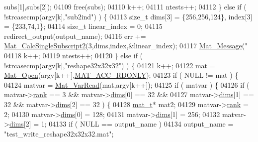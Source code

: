 \begin{DoxyCode}
{{{{{{{{{{{{{{{{{{{{{{{{{{{{{{{{{{{{{{{{{{{{{{{{{{{{{{{{{{{{{{{{{{{{{{      subs[1],subs[2]);
04109             free(subs);
04110             k++;
04111             ntests++;
04112         \} \textcolor{keywordflow}{else} \textcolor{keywordflow}{if} ( !strcasecmp(argv[k],\textcolor{stringliteral}{"sub2ind"}) ) \{
04113             \textcolor{keywordtype}{size\_t} dims[3] = \{256,256,124\}, index[3] = \{233,74,1\};
04114             \textcolor{keywordtype}{size\_t} linear\_index = 0;
04115             redirect\_output(output\_name);
04116             err += \hyperlink{group___m_a_t_ga5f7923e9d61ad728c127439044c4ae0e}{Mat\_CalcSingleSubscript2}(3,dims,index,&linear\_index);
04117             \hyperlink{group__mat__util_gae7dfa394b111bc908a616f8f5bddaa97}{Mat\_Message}(\textcolor{stringliteral}{"%
04118             k++;
04119             ntests++;
04120         \} \textcolor{keywordflow}{else} \textcolor{keywordflow}{if} ( !strcasecmp(argv[k],\textcolor{stringliteral}{"reshape32x32x32"}) ) \{
04121             k++;
04122             mat = \hyperlink{group___m_a_t_gafbfedb5636a99f0ef867520c47f77d18}{Mat\_Open}(argv[k++],\hyperlink{group___m_a_t_ggaa9dcbc70f538af79bd557593ff6b5cdba8dd1457651b27ba9bea6cfba158c037c}{MAT\_ACC\_RDONLY});
04123             \textcolor{keywordflow}{if} ( NULL != mat ) \{
04124                 matvar = \hyperlink{group___m_a_t_ga3505f63029763eaa73d5a19f1115eb42}{Mat\_VarRead}(mat,argv[k++]);
04125                 \textcolor{keywordflow}{if} ( matvar ) \{
04126                     \textcolor{keywordflow}{if} ( matvar->\hyperlink{group___m_a_t_a84ba70c96ded13cc555fa75b768d9921}{rank} == 3 && matvar->\hyperlink{group___m_a_t_a8e01234e1c862ce3472bb37f5a09b92c}{dims}[0] == 32 &&
04127                         matvar->\hyperlink{group___m_a_t_a8e01234e1c862ce3472bb37f5a09b92c}{dims}[1] == 32 && matvar->\hyperlink{group___m_a_t_a8e01234e1c862ce3472bb37f5a09b92c}{dims}[2] == 32 ) \{
04128                         \hyperlink{struct__mat__t}{mat\_t}* mat2;
04129                         matvar->\hyperlink{group___m_a_t_a84ba70c96ded13cc555fa75b768d9921}{rank} = 2;
04130                         matvar->\hyperlink{group___m_a_t_a8e01234e1c862ce3472bb37f5a09b92c}{dims}[0] = 128;
04131                         matvar->\hyperlink{group___m_a_t_a8e01234e1c862ce3472bb37f5a09b92c}{dims}[1] = 256;
04132                         matvar->\hyperlink{group___m_a_t_a8e01234e1c862ce3472bb37f5a09b92c}{dims}[2] = 1;
04133                         \textcolor{keywordflow}{if} ( NULL == output\_name )
04134                             output\_name = \textcolor{stringliteral}{"test\_write\_reshape32x32x32.mat"};
}}}}}}}}}}}}}}}}}}}}}}}}}}}}}}}}}}}}}}}}}}}}}}}}}}}}}}}}}}}}}}}}}}}}}}}
\end{DoxyCode}
